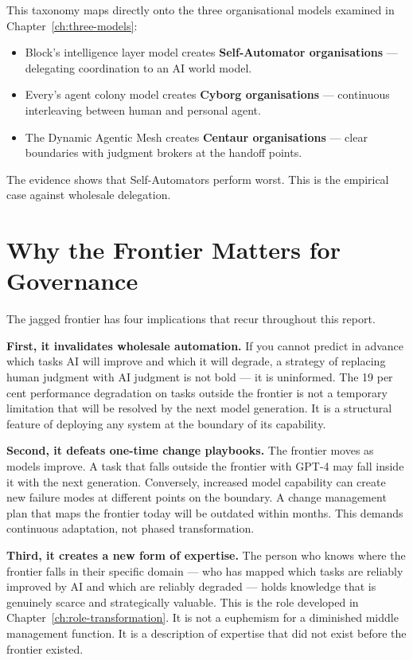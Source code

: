\begin{keyinsight}[title={The Organisational Design Implication}]
This taxonomy maps directly onto the three organisational models examined in Chapter~\ref{ch:three-models}:
\begin{itemize}
  \item Block's intelligence layer model creates \textbf{Self-Automator organisations} --- delegating coordination to an AI world model.
  \item Every's agent colony model creates \textbf{Cyborg organisations} --- continuous interleaving between human and personal agent.
  \item The Dynamic Agentic Mesh creates \textbf{Centaur organisations} --- clear boundaries with judgment brokers at the handoff points.
\end{itemize}
The evidence shows that Self-Automators perform worst. This is the empirical case against wholesale delegation.
\end{keyinsight}

\section{Why the Frontier Matters for Governance}

The jagged frontier has four implications that recur throughout this report.

\textbf{First, it invalidates wholesale automation.} If you cannot predict in advance which tasks AI will improve and which it will degrade, a strategy of replacing human judgment with AI judgment is not bold --- it is uninformed. The 19 per cent performance degradation on tasks outside the frontier is not a temporary limitation that will be resolved by the next model generation. It is a structural feature of deploying any system at the boundary of its capability.

\textbf{Second, it defeats one-time change playbooks.} The frontier moves as models improve. A task that falls outside the frontier with GPT-4 may fall inside it with the next generation. Conversely, increased model capability can create new failure modes at different points on the boundary. A change management plan that maps the frontier today will be outdated within months. This demands continuous adaptation, not phased transformation.

\textbf{Third, it creates a new form of expertise.} The person who knows where the frontier falls in their specific domain --- who has mapped which tasks are reliably improved by AI and which are reliably degraded --- holds knowledge that is genuinely scarce and strategically valuable. This is the  role developed in Chapter~\ref{ch:role-transformation}. It is not a euphemism for a diminished middle management function. It is a description of expertise that did not exist before the frontier existed.


